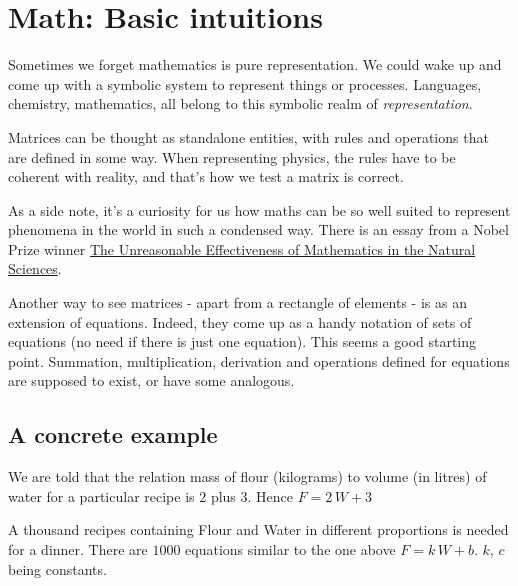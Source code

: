 \section{Math: Basic intuitions}
Sometimes we forget mathematics is pure representation. We could wake up and come up with a symbolic system to represent things or processes. Languages, chemistry, mathematics, all belong to this symbolic realm of \textit{representation}.

Matrices can be thought as standalone entities, with rules and operations that are defined in some way. When representing physics, the rules have to be coherent with reality, and that's how we test a matrix is correct. 

As a side note, it's a curiosity for us how maths can be so well suited to represent phenomena in the world in such a condensed way. There is an essay from a Nobel Prize winner \href{https://en.wikipedia.org/wiki/The_Unreasonable_Effectiveness_of_Mathematics_in_the_Natural_Sciences}{The Unreasonable Effectiveness of Mathematics in the Natural Sciences}. 

Another way to see matrices - apart from a rectangle of elements - is as an extension of equations. Indeed, they come up as a handy notation of sets of equations (no need if there is just one equation). This seems a good starting point. Summation, multiplication, derivation and operations defined for equations are supposed to exist, or have some analogous.

\subsection{A concrete example}
We are told that the relation mass of flour (kilograms) to volume (in litres) of water for a particular recipe is $2$ plus $3$. Hence $F = 2\,W + 3$

A thousand recipes containing Flour and Water in different proportions is needed for a dinner. There are $1000$ equations similar to the one above $F= k\,W + b$. $k$, $c$ being constants. 

